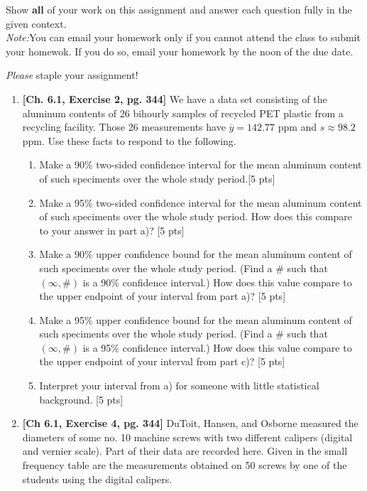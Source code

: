 \documentclass[11pt]{article}\usepackage[]{graphicx}\usepackage[]{color}
\begin{document}

\pagestyle{fancy} 

Show \textbf{all} of your work on this assignment and answer each question fully in the given context.\\

\emph{Note:}You can email your homework only if you cannot attend the class to submit your homewok. If you do so, email your homework by the noon of the due date. 


\emph{Please} staple your assignment!


\begin{enumerate}
	
    \item \textbf{[Ch. 6.1, Exercise 2, pg. 344]} We have a data set consisting of the aluminum contents of 26 bihourly samples of recycled PET plastic from a recycling facility. Those 26 measurements have $\overline{y} = 142.77$ ppm and $s \approx 98.2$ ppm. Use these facts to respond to the following.
    
      \begin{enumerate}
        \item Make a 90\% two-sided confidence interval for the mean aluminum content of such speciments over the whole study period.[5 pts]
        \item Make a 95\% two-sided confidence interval for the mean aluminum content of such speciments over the whole study period. How does this compare to your answer in part a)? [5 pts]
        \item Make a 90\% upper confidence bound for the mean aluminum content of such speciments over the whole study period. (Find a # such that $(\infty, \#)$ is a 90\% confidence interval.) How does this value compare to the upper endpoint of your interval from part a)? [5 pts]
        \item Make a 95\% upper confidence bound for the mean aluminum content of such speciments over the whole study period. (Find a # such that $(\infty, \#)$ is a 95\% confidence interval.) How does this value compare to the upper endpoint of your interval from part c)? [5 pts]
        \item Interpret your interval from a) for someone with little statistical background. [5 pts]
      \end{enumerate}
      
    \item \textbf{ [Ch 6.1, Exercise 4, pg. 344]} DuToit, Hansen, and Osborne measured the diameters of some no. 10 machine screws with two different calipers (digital and vernier scale). Part of their data are recorded here. Given in the small frequency table are the measurements obtained on 50 screws by one of the students using the digital calipers.




\end{enumerate}
\end{document}
